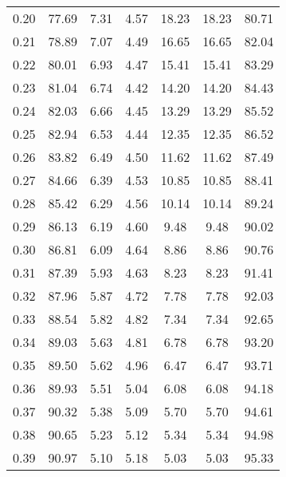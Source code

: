 \begin{tabular}{|c|c|c|c|c|c|c|}
      0.20 &     77.69 &      7.31 &       4.57 &   18.23 &      18.23 &         80.71 \\
      0.21 &     78.89 &      7.07 &       4.49 &   16.65 &      16.65 &         82.04 \\
      0.22 &     80.01 &      6.93 &       4.47 &   15.41 &      15.41 &         83.29 \\
      0.23 &     81.04 &      6.74 &       4.42 &   14.20 &      14.20 &         84.43 \\
      0.24 &     82.03 &      6.66 &       4.45 &   13.29 &      13.29 &         85.52 \\
      0.25 &     82.94 &      6.53 &       4.44 &   12.35 &      12.35 &         86.52 \\
      0.26 &     83.82 &      6.49 &       4.50 &   11.62 &      11.62 &         87.49 \\
      0.27 &     84.66 &      6.39 &       4.53 &   10.85 &      10.85 &         88.41 \\
      0.28 &     85.42 &      6.29 &       4.56 &   10.14 &      10.14 &         89.24 \\
      0.29 &     86.13 &      6.19 &       4.60 &    9.48 &       9.48 &         90.02 \\
      0.30 &     86.81 &      6.09 &       4.64 &    8.86 &       8.86 &         90.76 \\
      0.31 &     87.39 &      5.93 &       4.63 &    8.23 &       8.23 &         91.41 \\
      0.32 &     87.96 &      5.87 &       4.72 &    7.78 &       7.78 &         92.03 \\
      0.33 &     88.54 &      5.82 &       4.82 &    7.34 &       7.34 &         92.65 \\
      0.34 &     89.03 &      5.63 &       4.81 &    6.78 &       6.78 &         93.20 \\
      0.35 &     89.50 &      5.62 &       4.96 &    6.47 &       6.47 &         93.71 \\
      0.36 &     89.93 &      5.51 &       5.04 &    6.08 &       6.08 &         94.18 \\
      0.37 &     90.32 &      5.38 &       5.09 &    5.70 &       5.70 &         94.61 \\
      0.38 &     90.65 &      5.23 &       5.12 &    5.34 &       5.34 &         94.98 \\
      0.39 &     90.97 &      5.10 &       5.18 &    5.03 &       5.03 &         95.33 \\

\end{tabular}
